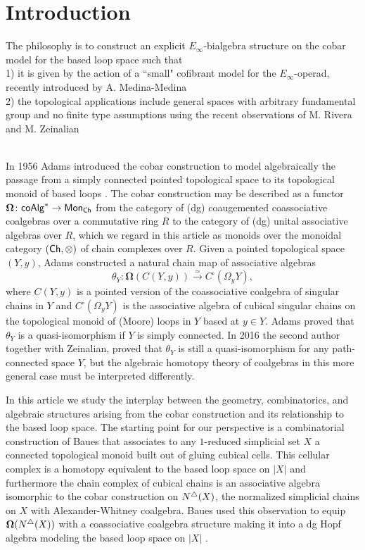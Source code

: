 \section{Introduction}

The philosophy is to construct an explicit $E_{\infty}$-bialgebra structure on the cobar model for the based loop space such that
\\
1) it is given by the action of a ``small" cofibrant model for the $E_{\infty}$-operad, recently introduced by A. Medina-Medina
\\
2) the topological applications include general spaces with arbitrary fundamental group and no finite type assumptions using the recent observations of M. Rivera and M. Zeinalian 

\ \\

In 1956 Adams introduced the cobar construction to model algebraically the passage from a simply connected pointed topological space to its topological monoid of based loops \cite{Adams}. The cobar construction may be described as a functor $\mathbf{\Omega} \colon \mathsf{coAlg}^* \to \mathsf{Mon}_{\mathsf{Ch}}$ from the category of (dg) coaugemented coassociative coalgebras over a commutative ring $R$ to the category of (dg) unital associative algebras over $R$, which we regard in this article as monoids over the monoidal category $(\mathsf{Ch}, \otimes) $ of chain complexes over $R$. Given a pointed topological space $(Y,y)$, Adams constructed a natural chain map of associative algebras
$$\theta_Y: \mathbf{\Omega}(C(Y,y)) \xrightarrow{\simeq} C^{\square}(\Omega_yY),$$ where $C(Y,y)$ is a pointed version of the coassociative coalgebra of singular chains in $Y$ and $C^{\square}(\Omega_yY)$ is the associative algebra of cubical singular chains on the topological monoid of (Moore) loops in $Y$ based at $y \in Y$. Adams proved that $\theta_Y$ is a quasi-isomorphism if $Y$ is simply connected. In 2016 the second author together with Zeinalian, proved that $\theta_Y$ is still a quasi-isomorphism for any path-connected space $Y$, but the algebraic homotopy theory of coalgebras in this more general case must be interpreted differently.

In this article we study the interplay between the geometry, combinatorics, and algebraic structures arising from the cobar construction and its relationship to the based loop space. The starting point for our perspective is a combinatorial construction of Baues that associates to any $1$-reduced simplicial set $X$ a connected topological monoid built out of gluing cubical cells.  This cellular complex is a homotopy equivalent to the based loop space on $|X|$ and furthermore the chain complex of cubical chains is an associative algebra isomorphic to the cobar construction on $N^{\triangle}(X)$, the normalized simplicial chains on $X$ with Alexander-Whitney coalgebra. Baues used this observation to equip $\mathbf{\Omega}( N^{\triangle} (X) )$ with a coassociative coalgebra structure making it into a dg Hopf algebra modeling the based loop space on $|X|$ \cite{Baues}. 

